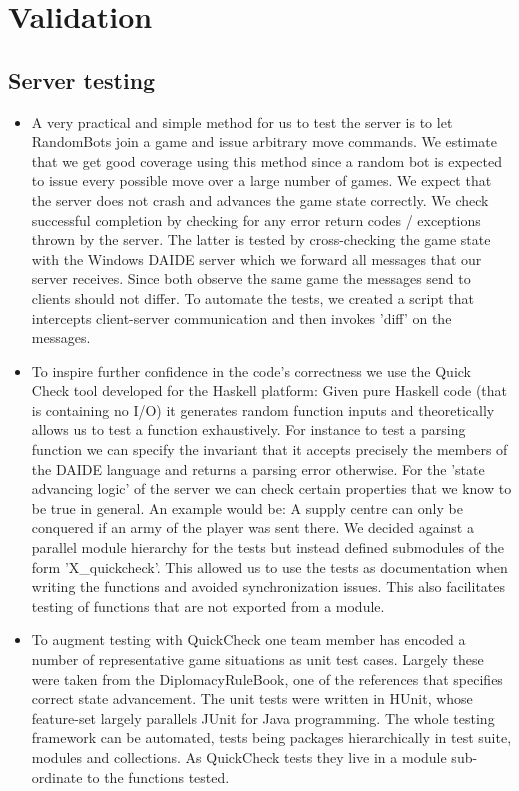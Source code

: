 \documentclass[pdftex,12pt,a4paper]{report}
\begin{document}

\pagebreak

\section{Validation}

\subsection{Server testing}

\begin{itemize}
\item A very practical and simple method for us to test the server is
  to let RandomBots join a game and issue arbitrary move commands. We
  estimate that we get good coverage using this method since a random
  bot is expected to issue every possible move over a large number of
  games. We expect that the server does not crash and advances the
  game state correctly. We check successful completion by checking for
  any error return codes / exceptions thrown by the server. The latter
  is tested by cross-checking the game state with the Windows DAIDE
  server which we forward all messages that our server receives. Since
  both observe the same game the messages send to clients should not
  differ. To automate the tests, we created a script that intercepts
  client-server communication and then invokes 'diff' on the messages.

\item To inspire further confidence in the code's correctness we use
  the Quick Check tool developed for the Haskell platform: Given pure
  Haskell code (that is containing no I/O) it generates random
  function inputs and theoretically allows us to test a function
  exhaustively. For instance to test a parsing function we can specify
  the invariant that it accepts precisely the members of the DAIDE
  language and returns a parsing error otherwise. For the 'state
  advancing logic' of the server we can check certain properties that
  we know to be true in general. An example would be: A supply centre
  can only be conquered if an army of the player was sent there. We
  decided against a parallel module hierarchy for the tests but
  instead defined submodules of the form 'X\_quickcheck'.  This
  allowed us to use the tests as documentation when writing the
  functions and avoided synchronization issues. This also facilitates
  testing of functions that are not exported from a module.

\item To augment testing with QuickCheck one team member has encoded a
  number of representative game situations as unit test cases. Largely
  these were taken from the DiplomacyRuleBook, one of the references
  that specifies correct state advancement. The unit tests were
  written in HUnit, whose feature-set largely parallels JUnit for Java
  programming. The whole testing framework can be automated, tests
  being packages hierarchically in test suite, modules and
  collections.  As QuickCheck tests they live in a module sub-
  ordinate to the functions tested.
\end{itemize}
\end{document}
